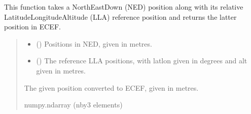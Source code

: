 \documentclass[letterpaper,10pt,english]{sphinxmanual}
\begin{document}
\begin{fulllineitems}
\label{\detokenize{modules/util/transformations:qnav.util.transformations.ned2ecef_vec}}
\pysigstartsignatures
{}
\pysigstopsignatures
\sphinxAtStartPar
This function takes a North\sphinxhyphen{}East\sphinxhyphen{}Down (NED) position along with its
relative Latitude\sphinxhyphen{}Longitude\sphinxhyphen{}Altitude (LLA) reference position and
returns the latter position in ECEF.
\begin{quote}\begin{description}
\begin{itemize}
\item {} 
\sphinxAtStartPar
{} (\sphinxstyleliteralemphasis{\sphinxupquote{  (}}\sphinxstyleliteralemphasis{\sphinxupquote{)}}) \textendash{} Positions in NED, given in metres.

\item {} 
\sphinxAtStartPar
{} (\sphinxstyleliteralemphasis{\sphinxupquote{ (}}\sphinxstyleliteralemphasis{\sphinxupquote{)}}) \textendash{} The reference LLA positions, with lat\sphinxhyphen{}lon given in
degrees and alt given in metres.

\end{itemize}

\sphinxAtStartPar
The given position converted to ECEF, given in metres.

\sphinxAtStartPar
numpy.ndarray (n\sphinxhyphen{}by\sphinxhyphen{}3 elements)

\end{description}\end{quote}

\end{fulllineitems}

\end{document}

